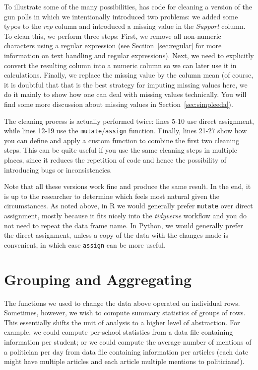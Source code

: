 
To illustrate some of the many possibilities,  has code for cleaning a version of the gun polls
in which we intentionally introduced two problems: we added some typos to the \emph{rep} column
and introduced a missing value in the \emph{Support} column.
To clean this, we perform three steps: First, we remove all non-numeric characters using a regular expression
(see Section~\ref{sec:regular} for more information on text handling and regular expressions).
Next, we need to explicitly convert the resulting column into a numeric column so we can later use it in calculations.
Finally, we replace the missing value by the column mean
(of course, it is doubtful that that is the best strategy for imputing missing values here,
we do it mainly to show how one can deal with missing values technically. You will find some more discussion about missing values in Section~\ref{sec:simpleeda}).

The cleaning process is actually performed twice: lines 5-10 use direct assignment,
while lines 12-19 use the \texttt{mutate}/\texttt{assign} function.
Finally, lines 21-27 show how you can define and apply a custom function to combine the first two cleaning steps.
This can be quite useful if you use the same cleaning steps in multiple places,
since it reduces the repetition of code and hence the possibility of introducing bugs or inconsistencies.

Note that all these versions work fine and produce the same result.
In the end, it is up to the researcher to determine which feels most natural given the circumstances.
As noted above, in R we would generally prefer \texttt{mutate} over direct assignment,
mostly because it fits nicely into the \emph{tidyverse} workflow and you do not need to repeat the data frame name.
In Python, we would generally prefer the direct assignment, unless a copy of the data with the changes made is convenient, 
in which case \texttt{assign} can be more useful.

\section{Grouping and Aggregating} \label{sec:grouping}

The functions we used to change the data above operated on individual rows.
Sometimes, however, we wish to compute summary statistics of groups of rows.
This essentially shifts the unit of analysis to a higher level of abstraction.
For example, we could compute per-school statistics from a data file containing information per student;
or we could compute the average number of mentions of a politician per day from data file containing information per articles (each date might have multiple articles and each article multiple mentions to politicians!).

